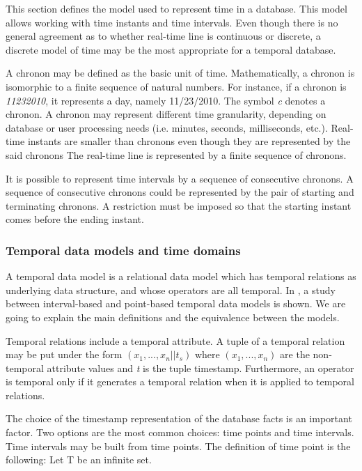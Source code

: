 %
%
This section defines the model used to represent time in a database. This model allows working with time instants and time intervals.  Even though there is no general agreement as to whether real-time line is continuous or discrete, a discrete model of time may be the most appropriate for a temporal database. 

	A chronon may be defined as the basic unit of time. Mathematically, a chronon is isomorphic to a finite sequence of natural numbers. For instance, if a chronon is \emph{11232010}, it represents a day, namely 11/23/2010. The symbol \emph{c} denotes a chronon. A chronon may represent different time granularity, depending on database or user processing needs (i.e. minutes, seconds, milliseconds, etc.). Real-time instants are smaller than chronons even though they are represented by the said chronons The real-time line is represented by a finite sequence of chronons. 

	It is possible to represent time intervals by a sequence of consecutive chronons. A sequence of consecutive chronons could be represented by the pair of starting and terminating chronons. A restriction must be imposed so that the starting instant comes before the ending instant.
\subsubsection{Temporal data models and time domains}
\label{sec:temporaldatamodelsandtimedomains}
A temporal data model is a relational data model which has temporal relations as underlying data structure, and whose operators are all temporal. In \cite{Böhlen_point-versus}, a study between interval-based and point-based temporal data models is shown. We are going to explain the main definitions and the equivalence between the models.

Temporal relations include a temporal attribute. A tuple of a temporal relation may be put under the form $(x_1,...,x_n||t_s)$ where $(x_1,...,x_n)$ are the non-temporal attribute values and \emph{t} is the tuple timestamp. Furthermore, an operator is temporal only if it generates a temporal relation when it is applied to temporal relations.

	The choice of the timestamp representation of the database facts is an important factor. Two options are the most common choices: time points and time intervals. Time intervals may be built from time points. The definition of time point is the following:
Let T be an infinite set.

